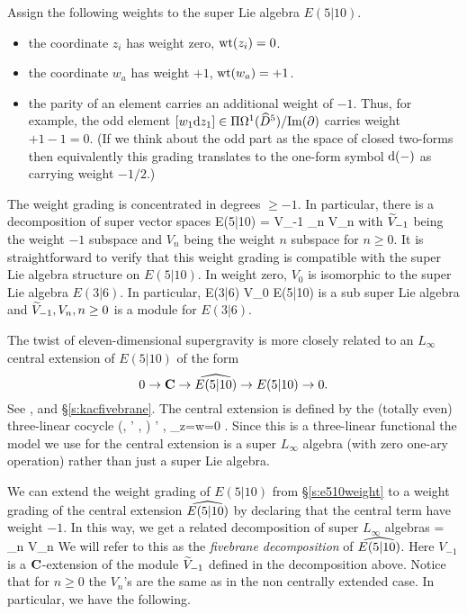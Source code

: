 \documentclass[11pt]{amsart}
\begin{document}
Assign the following weights to the super Lie algebra $E(5|10)$. 
\begin{itemize} 
\item the coordinate $z_i$ has weight zero, $\wt(z_i) = 0$. 
\item the coordinate $w_a$ has weight $+1$, $\wt(w_a) = +1$. 
\item the parity of an element carries an additional weight of $-1$. 
Thus, for example, the odd element $[w_1 \d z_1] \in \Pi \Omega^1(\Hat{D}^5)/{\rm Im}(\del)$ carries weight $+1 - 1 = 0$. 
(If we think about the odd part as the space of closed two-forms then equivalently this grading translates to the one-form symbol $\d(-)$ as carrying weight $-1/2$.)
\end{itemize} 
The weight grading is concentrated in degrees $\geq -1$. 
In particular, there is a decomposition of super vector spaces
\beqn\label{eqn:decomp1}
E(5|10) = \til V_{-1} \times \prod_{n } V_n 
\eeqn
with $\til V_{-1}$ being the weight $-1$ subspace and $V_n$ being the weight $n$ subspace for $n \geq 0$.  
It is straightforward to verify that this weight grading is compatible with the super Lie algebra structure on $E(5|10)$. 
In weight zero, $V_0$ is isomorphic to the super Lie algebra $E(3|6)$.
In particular, 
\beqn 
\label{eqn:e36iso}
E(3|6) \cong V_0 \subset E(5|10)
\eeqn
is a sub super Lie algebra and $\til{V}_{-1}, V_n, n \geq 0$ is a module for $E(3|6)$. 

\parsec[s:e510central]

The twist of eleven-dimensional supergravity is more closely related to an $L_\infty$ central extension of $E(5|10)$ of the form
\[
0 \to \C \to \Hat{E(5|10)} \to E(5|10) \to 0 .
\]
See \cite[\S 3]{RSW}, and \S \ref{s:kacfivebrane}.
The central extension is defined by the (totally even) three-linear cocycle
\beqn\label{eqn:e510central}
(\mu, \mu' , \alpha) \mapsto \<\mu \wedge \mu' , \alpha\>_{z=w=0} \in \C .
\eeqn
Since this is a three-linear functional the model we use for the central extension is a super $L_\infty$ algebra (with zero one-ary operation) rather than just a super Lie algebra.

We can extend the weight grading of $E(5|10)$ from \S \ref{s:e510weight} to a weight grading of the central extension $\Hat{E(5|10)}$ by declaring that the central term have weight $-1$.
In this way, we get a related decomposition of super $L_\infty$ algebras
\beqn\label{eqn:decomp1}
 = \prod_{n } V_n
\eeqn
We will refer to this as the \textit{fivebrane decomposition} of $\Hat{E(5|10)}$.
Here $V_{-1}$ is a $\C$-extension of the module $\til V_{-1}$ defined in the decomposition above.
Notice that for $n \geq 0$ the $V_n$'s are the same as in the non centrally extended case.
In particular, we have the following. 
\end{document}

